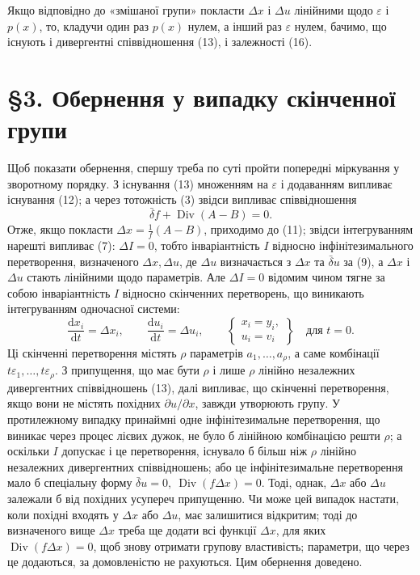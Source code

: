 \documentclass[11pt]{article}
\providecommand{\eps}{\varepsilon}
\providecommand{\D}{\Delta}
\providecommand{\p}{\partial}
\providecommand{\dd}{\mathrm d}
\DeclareMathOperator{\Div}{Div}
\providecommand{\bd}{\bar{\delta}}
\begin{document}
Якщо відповідно до «змішаної групи» покласти \(\D x\) і \(\D u\) лінійними щодо \(\eps\) і \(p(x)\), то, кладучи один раз \(p(x)\) нулем, а інший раз \(\eps\) нулем, бачимо, що існують і дивергентні співвідношення (13), і залежності (16).

\section*{\S{}3. Обернення у випадку скінченної групи}

Щоб показати обернення, спершу треба по суті пройти попередні міркування у зворотному порядку. З існування (13) множенням на \(\eps\) і додаванням випливає існування (12); а через тотожність (3) звідси випливає співвідношення
\[
\bd f+\Div(A-B)=0.
\]
Отже, якщо покласти \(\D x=\frac{1}{f}(A-B)\), приходимо до (11); звідси інтегруванням нарешті випливає (7): \(\D I=0\), тобто інваріантність \(I\) відносно інфінітезимального перетворення, визначеного \(\D x,\D u\), де \(\D u\) визначається з \(\D x\) та \(\bd u\) за (9), а \(\D x\) і \(\D u\) стають лінійними щодо параметрів. Але \(\D I=0\) відомим чином тягне за собою інваріантність \(I\) відносно скінченних перетворень, що виникають інтегруванням одночасної системи:
\begin{equation}
\frac{\dd x_i}{\dd t}=\D x_i,\qquad
\frac{\dd u_i}{\dd t}=\D u_i,\qquad
\left\{\begin{array}{l}
x_i=y_i,\\
u_i=v_i
\end{array}\right\}
\quad\text{для }t=0.
\tag{17}
\end{equation}
Ці скінченні перетворення містять \(\rho\) параметрів \(a_1,\ldots,a_\rho\), а саме комбінації \(t\eps_1,\ldots,t\eps_\rho\). З припущення, що має бути \(\rho\) і лише \(\rho\) лінійно незалежних дивергентних співвідношень (13), далі випливає, що скінченні перетворення, якщо вони не містять похідних \(\p u/\p x\), завжди утворюють групу. У протилежному випадку принаймні одне інфінітезимальне перетворення, що виникає через процес лієвих дужок, не було б лінійною комбінацією решти \(\rho\); а оскільки \(I\) допускає і це перетворення, існувало б більш ніж \(\rho\) лінійно незалежних дивергентних співвідношень; або це інфінітезимальне перетворення мало б спеціальну форму \(\bd u=0,\ \Div(f\D x)=0\). Тоді, однак, \(\D x\) або \(\D u\) залежали б від похідних усупереч припущенню. Чи може цей випадок настати, коли похідні входять у \(\D x\) або \(\D u\), має залишитися відкритим; тоді до визначеного вище \(\D x\) треба ще додати всі функції \(\D x\), для яких \(\Div(f\D x)=0\), щоб знову отримати групову властивість; параметри, що через це додаються, за домовленістю не рахуються. Цим обернення доведено.
\end{document}
